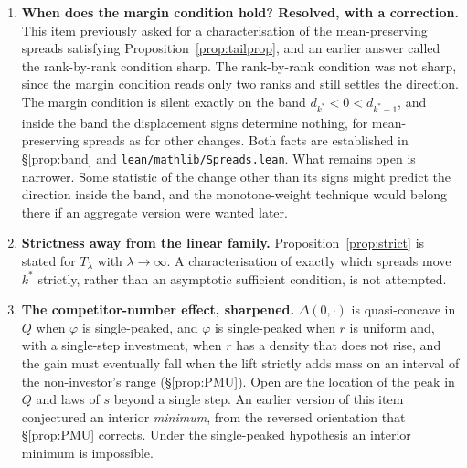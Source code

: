 \documentclass[11pt]{article}
\newcommand{\file}[1]{\href{run:#1}{\texttt{#1}}}
\begin{document}
\begin{enumerate}
\item \textbf{When does the margin condition hold? Resolved, with a
  correction.}
  \label{item:tailopen}
  This item previously asked for a characterisation of the mean-preserving
  spreads satisfying Proposition~\ref{prop:tailprop}, and an earlier answer
  called the rank-by-rank condition sharp. The rank-by-rank condition was not
  sharp, since the margin condition reads only two ranks and still settles the
  direction. The margin condition is silent exactly on the band
  $d_{k^*}<0<d_{k^*+1}$, and inside the band the displacement signs determine
  nothing, for mean-preserving spreads as for other changes. Both facts are
  established in \S\ref{prop:band} and \file{lean/mathlib/Spreads.lean}. What
  remains open is narrower. Some statistic of the change other than its signs
  might predict the direction inside the band, and the
  \citet{CostrellLoury2004} monotone-weight technique would belong there if an
  aggregate version were wanted later.
\item \textbf{Strictness away from the linear family.}
  Proposition~\ref{prop:strict} is stated for $T_\lambda$ with
  $\lambda\to\infty$. A characterisation of exactly which spreads move
  $k^*$ strictly, rather than an asymptotic sufficient condition, is not
  attempted.
\item \textbf{The competitor-number effect, sharpened.} $\Delta(0,\cdot)$ is
  quasi-concave in $Q$ when $\varphi$ is single-peaked, and $\varphi$ is
  single-peaked when $r$ is uniform and, with a single-step investment, when
  $r$ has a density that does not rise, and the gain must eventually fall
  when the lift strictly adds mass on an interval of the non-investor's range
  (\S\ref{prop:PMU}). Open are the location of the peak in $Q$ and laws of
  $s$ beyond a single step. An earlier version of this item conjectured an interior
  \emph{minimum}, from the reversed orientation that \S\ref{prop:PMU} corrects.
  Under the single-peaked hypothesis an interior minimum is impossible.
\end{enumerate}


\end{document}
